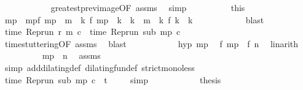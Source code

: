 \begin{isabellebody}
\ \ \ \ \ \ \ \ \ \ \isamarkupfalse%
\ greatest{\isacharunderscore}prev{\isacharunderscore}image{\isacharbrackleft}OF\ assms{\isacharbrackright}\ \isamarkupfalse%
\ simp\isanewline
\ \ \ \ \ \ \ \ \isamarkupfalse%
\ this\ \isamarkupfalse%
\ m\isactrlsub p\ \ mp{\isacharcolon}{\isacartoucheopen}f\ m\isactrlsub p\ {\isacharless}\ m\ {\isasymand}\ {\isacharparenleft}{\isasymforall}k{\isachardot}\ f\ m\isactrlsub p\ {\isacharless}\ k\ {\isasymand}\ k\ {\isasymle}\ m\ {\isasymlongrightarrow}\ {\isacharparenleft}{\isasymnexists}k\ f\ k\ {\isacharequal}\ k{\isacharparenright}{\isacharparenright}{\isacartoucheclose}\isanewline
\ \ \ \ \ \ \ \ \ \ \isamarkupfalse%
\ blast\isanewline
\ \ \ \ \ \ \ \ \isamarkupfalse%
\ {\isacartoucheopen}time\ {\isacharparenleft}{\isacharparenleft}Rep{\isacharunderscore}run\ r{\isacharparenright}\ m\ c{\isacharparenright}\ {\isacharequal}\ time\ {\isacharparenleft}{\isacharparenleft}Rep{\isacharunderscore}run\ sub{\isacharparenright}\ m\isactrlsub p\ c{\isacharparenright}{\isacartoucheclose}\isanewline
\ \ \ \ \ \ \ \ \ \ \isamarkupfalse%
\ time{\isacharunderscore}stuttering{\isacharbrackleft}OF\ assms{\isacharbrackright}\ \isamarkupfalse%
\ blast\isanewline
\ \ \ \ \ \ \ \ \isamarkupfalse%
\ \isamarkupfalse%
\ hyp\ mp\ \isamarkupfalse%
\ {\isacartoucheopen}f\ m\isactrlsub p\ {\isacharless}\ f\ n{\isacartoucheclose}\ \isamarkupfalse%
\ linarith\isanewline
\ \ \ \ \ \ \ \ \isamarkupfalse%
\ {\isacartoucheopen}m\isactrlsub p\ {\isacharless}\ n{\isacartoucheclose}\ \isamarkupfalse%
\ assms\isanewline
\ \ \ \ \ \ \ \ \ \ \isamarkupfalse%
\ {\isacharparenleft}simp\ add{\isacharcolon}dilating{\isacharunderscore}def\ dilating{\isacharunderscore}fun{\isacharunderscore}def\ strict{\isacharunderscore}mono{\isacharunderscore}less{\isacharparenright}\isanewline
\ \ \ \ \ \ \ \ \isamarkupfalse%
\ {\isacartoucheopen}time\ {\isacharparenleft}{\isacharparenleft}Rep{\isacharunderscore}run\ sub{\isacharparenright}\ m\isactrlsub p\ c{\isacharparenright}\ {\isacharless}\ t{\isacartoucheclose}\ \isamarkupfalse%
\ {\isacharasterisk}\ \isamarkupfalse%
\ simp\isanewline
\ \ \ \ \ \ \ \ \isamarkupfalse%
\ \isamarkupfalse%
\ {\isacharquery}thesis\ \isamarkupfalse%

\end{isabellebody}
